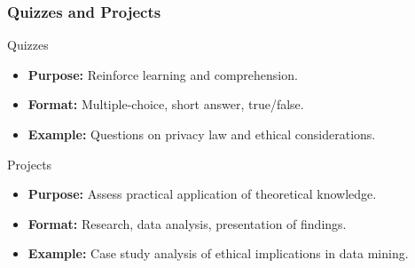 \documentclass[aspectratio=169]{beamer}
\begin{document}
\begin{frame}[fragile]
    \frametitle{Quizzes and Projects}
    \begin{block}{Quizzes}
        \begin{itemize}
            \item \textbf{Purpose:} Reinforce learning and comprehension.
            \item \textbf{Format:} Multiple-choice, short answer, true/false.
            \item \textbf{Example:} Questions on privacy law and ethical considerations.
        \end{itemize}
    \end{block}
    
    \vfill
    
    \begin{block}{Projects}
        \begin{itemize}
            \item \textbf{Purpose:} Assess practical application of theoretical knowledge.
            \item \textbf{Format:} Research, data analysis, presentation of findings.
            \item \textbf{Example:} Case study analysis of ethical implications in data mining.
        \end{itemize}
    \end{block}
\end{frame}
\end{document}
